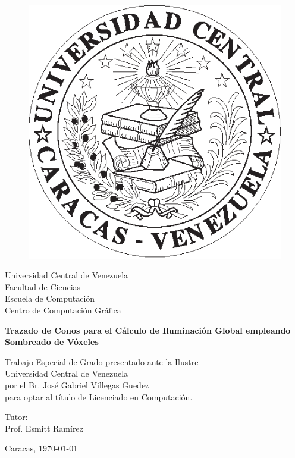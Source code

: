 \label{ch:portada}
\thispagestyle{empty}

\begin{figure}[t]
    \centering
    \includegraphics[height=0.15\textwidth]{media/logoucv.eps}
\end{figure}

\begin{center}
	Universidad Central de Venezuela\\
	Facultad de Ciencias\\
	Escuela de Computaci\'on\\
	Centro de Computaci\'on Gr\'afica\\
\end{center}
				
\vspace{2.5cm}

\begin{center}
	\large{\textbf{Trazado de Conos para el Cálculo de Iluminación Global empleando Sombreado de Vóxeles}}
\end{center}
				
\vspace{2.5cm}

\begin{center}
    Trabajo Especial de Grado presentado ante la Ilustre\\
    Universidad Central de Venezuela \\
    por el Br. José Gabriel Villegas Guedez\\
    para optar al título de Licenciado en Computación.
\end{center}

\vspace{2.5cm}				
				
\begin{center}
	Tutor:\\
	Prof. Esmitt Ramírez
\end{center}
				
\vspace{\fill}

\begin{center}
	Caracas, \monthyeardate\today
\end{center}
						